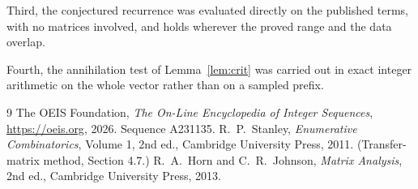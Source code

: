 \documentclass[11pt,a4paper]{article}
\theoremstyle{plain}
\theoremstyle{definition}
\begin{document}
Third, the conjectured recurrence was evaluated directly on the published terms, with no
matrices involved, and holds wherever the proved range and the data overlap.

Fourth, the annihilation test of Lemma~\ref{lem:crit} was carried out in exact integer
arithmetic on the whole vector rather than on a sampled prefix.

\begin{thebibliography}{9}
 The OEIS Foundation, \emph{The On-Line Encyclopedia of Integer
Sequences}, \url{https://oeis.org}, 2026. Sequence A231135.
 R.~P.~Stanley, \emph{Enumerative Combinatorics}, Volume 1, 2nd ed.,
Cambridge University Press, 2011. (Transfer-matrix method, Section 4.7.)
 R.~A.~Horn and C.~R.~Johnson, \emph{Matrix Analysis}, 2nd ed., Cambridge
University Press, 2013.
\end{thebibliography}
\end{document}
